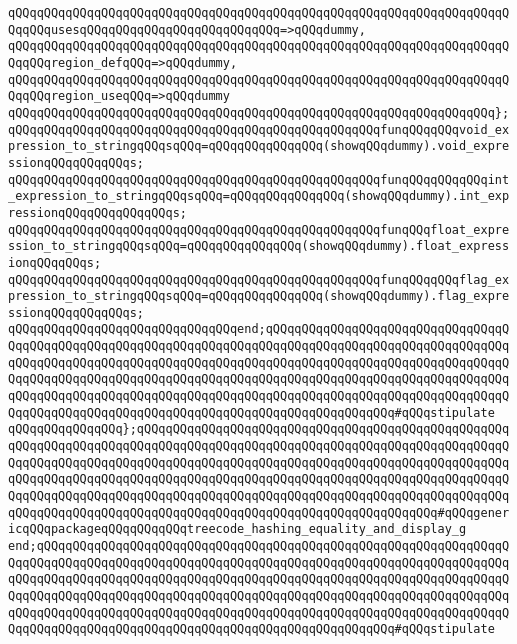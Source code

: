 \verb|qQQqqQQqqQQqqQQqqQQqqQQqqQQqqQQqqQQqqQQqqQQqqQQqqQQqqQQqqQQqqQQqqQQqqQQqqQQqusesqQQqqQQqqQQqqQQqqQQqqQQqqQQq=>qQQqdummy,|\newline
\verb|qQQqqQQqqQQqqQQqqQQqqQQqqQQqqQQqqQQqqQQqqQQqqQQqqQQqqQQqqQQqqQQqqQQqqQQqqQQqregion_defqQQq=>qQQqdummy,|\newline
\verb|qQQqqQQqqQQqqQQqqQQqqQQqqQQqqQQqqQQqqQQqqQQqqQQqqQQqqQQqqQQqqQQqqQQqqQQqqQQqregion_useqQQq=>qQQqdummy|\newline
\verb|qQQqqQQqqQQqqQQqqQQqqQQqqQQqqQQqqQQqqQQqqQQqqQQqqQQqqQQqqQQqqQQqqQQq};|\newline
\newline
\verb|qQQqqQQqqQQqqQQqqQQqqQQqqQQqqQQqqQQqqQQqqQQqqQQqqQQqfunqQQqqQQqvoid_expression_to_stringqQQqsqQQq=qQQqqQQqqQQqqQQq(showqQQqdummy).void_expressionqQQqqQQqqQQqs;|\newline
\verb|qQQqqQQqqQQqqQQqqQQqqQQqqQQqqQQqqQQqqQQqqQQqqQQqqQQqfunqQQqqQQqqQQqint_expression_to_stringqQQqsqQQq=qQQqqQQqqQQqqQQq(showqQQqdummy).int_expressionqQQqqQQqqQQqqQQqs;|\newline
\verb|qQQqqQQqqQQqqQQqqQQqqQQqqQQqqQQqqQQqqQQqqQQqqQQqqQQqfunqQQqfloat_expression_to_stringqQQqsqQQq=qQQqqQQqqQQqqQQq(showqQQqdummy).float_expressionqQQqqQQqs;|\newline
\verb|qQQqqQQqqQQqqQQqqQQqqQQqqQQqqQQqqQQqqQQqqQQqqQQqqQQqfunqQQqqQQqflag_expression_to_stringqQQqsqQQq=qQQqqQQqqQQqqQQq(showqQQqdummy).flag_expressionqQQqqQQqqQQqs;|\newline
\verb|qQQqqQQqqQQqqQQqqQQqqQQqqQQqqQQqend;qQQqqQQqqQQqqQQqqQQqqQQqqQQqqQQqqQQqqQQqqQQqqQQqqQQqqQQqqQQqqQQqqQQqqQQqqQQqqQQqqQQqqQQqqQQqqQQqqQQqqQQqqQQqqQQqqQQqqQQqqQQqqQQqqQQqqQQqqQQqqQQqqQQqqQQqqQQqqQQqqQQqqQQqqQQqqQQqqQQqqQQqqQQqqQQqqQQqqQQqqQQqqQQqqQQqqQQqqQQqqQQqqQQqqQQqqQQqqQQqqQQqqQQqqQQqqQQqqQQqqQQqqQQqqQQqqQQqqQQqqQQqqQQqqQQqqQQqqQQqqQQqqQQqqQQqqQQqqQQqqQQqqQQqqQQqqQQqqQQqqQQqqQQqqQQqqQQqqQQqqQQqqQQq#qQQqstipulate|\newline
\verb|qQQqqQQqqQQqqQQq};qQQqqQQqqQQqqQQqqQQqqQQqqQQqqQQqqQQqqQQqqQQqqQQqqQQqqQQqqQQqqQQqqQQqqQQqqQQqqQQqqQQqqQQqqQQqqQQqqQQqqQQqqQQqqQQqqQQqqQQqqQQqqQQqqQQqqQQqqQQqqQQqqQQqqQQqqQQqqQQqqQQqqQQqqQQqqQQqqQQqqQQqqQQqqQQqqQQqqQQqqQQqqQQqqQQqqQQqqQQqqQQqqQQqqQQqqQQqqQQqqQQqqQQqqQQqqQQqqQQqqQQqqQQqqQQqqQQqqQQqqQQqqQQqqQQqqQQqqQQqqQQqqQQqqQQqqQQqqQQqqQQqqQQqqQQqqQQqqQQqqQQqqQQqqQQqqQQqqQQqqQQqqQQqqQQqqQQqqQQqqQQqqQQqqQQq#qQQqgenericqQQqpackageqQQqqQQqqQQqtreecode_hashing_equality_and_display_g|\newline
\verb|end;qQQqqQQqqQQqqQQqqQQqqQQqqQQqqQQqqQQqqQQqqQQqqQQqqQQqqQQqqQQqqQQqqQQqqQQqqQQqqQQqqQQqqQQqqQQqqQQqqQQqqQQqqQQqqQQqqQQqqQQqqQQqqQQqqQQqqQQqqQQqqQQqqQQqqQQqqQQqqQQqqQQqqQQqqQQqqQQqqQQqqQQqqQQqqQQqqQQqqQQqqQQqqQQqqQQqqQQqqQQqqQQqqQQqqQQqqQQqqQQqqQQqqQQqqQQqqQQqqQQqqQQqqQQqqQQqqQQqqQQqqQQqqQQqqQQqqQQqqQQqqQQqqQQqqQQqqQQqqQQqqQQqqQQqqQQqqQQqqQQqqQQqqQQqqQQqqQQqqQQqqQQqqQQqqQQqqQQqqQQqqQQqqQQqqQQqqQQqqQQq#qQQqstipulate|\newline

